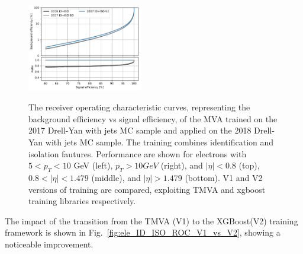 \begin{figure}[!htb]
\begin{center}
      \includegraphics[width=0.45\textwidth]{Figures/Electrons/2018_EE_10.pdf} \\
   \caption{The receiver operating characteristic curves, representing the background efficiency vs signal efficiency, of the MVA trained on the 2017 Drell-Yan
   with jets MC sample and applied on the 2018 Drell-Yan with jets MC sample. The training combines identification and isolation fautures. Performance are shown
   for electrons with $5 < p_T < 10$ GeV (left), $p_T > 10 GeV$ (right), and $|\eta|<0.8$ (top), $0.8 < |\eta| < 1.479$ (middle), and $|\eta| > 1.479$ (bottom).
   V1 and V2 versions of training are compared, exploiting TMVA and xgboost training libraries respectively.
   \label{fig:ele_ID_ISO_ROC_2018}}
   \end{center}
\end{figure}

The impact of the transition from the TMVA (V1) to the XGBoost(V2) training framework is shown in Fig.~\ref{fig:ele_ID_ISO_ROC_V1_vs_V2}, showing a noticeable improvement.

